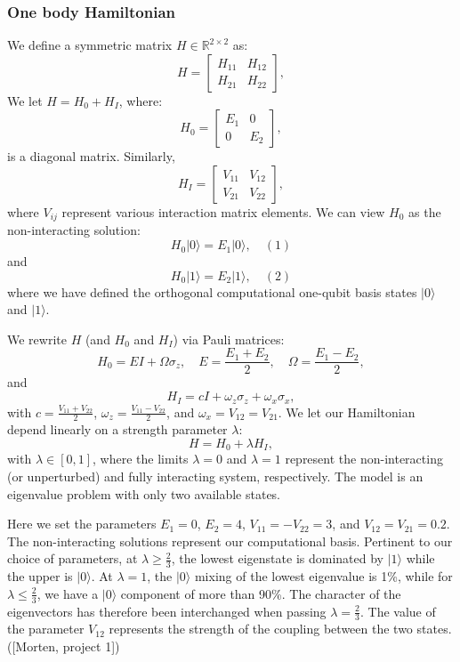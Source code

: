 \documentclass[onecolumn,10pt,cleanfoot]{asme2ej}
\begin{document}
\subsubsection{One body Hamiltonian}
We define a symmetric matrix $H \in \mathbb{R}^{2 \times 2}$ as:
\[
H =
\begin{bmatrix}
H_{11} & H_{12} \\
H_{21} & H_{22}
\end{bmatrix},
\]
We let $H = H_0 + H_I$, where:
\[
H_0 =
\begin{bmatrix}
E_1 & 0 \\
0 & E_2
\end{bmatrix},
\]
is a diagonal matrix. Similarly,
\[
H_I =
\begin{bmatrix}
V_{11} & V_{12} \\
V_{21} & V_{22}
\end{bmatrix},
\]
where $V_{ij}$ represent various interaction matrix elements. We can view $H_0$ as the non-interacting solution:
\[
H_0|0\rangle = E_1|0\rangle, \quad (1)
\]
and
\[
H_0|1\rangle = E_2|1\rangle, \quad (2)
\]
where we have defined the orthogonal computational one-qubit basis states $|0\rangle$ and $|1\rangle$.

We rewrite $H$ (and $H_0$ and $H_I$) via Pauli matrices:
\[
H_0 = E I + \Omega \sigma_z, \quad E = \frac{E_1 + E_2}{2}, \quad \Omega = \frac{E_1 - E_2}{2},
\]
and
\[
H_I = cI + \omega_z \sigma_z + \omega_x \sigma_x,
\]
with $c = \frac{V_{11} + V_{22}}{2}$, $\omega_z = \frac{V_{11} - V_{22}}{2}$, and $\omega_x = V_{12} = V_{21}$. We let our Hamiltonian depend linearly on a strength parameter $\lambda$:
\[
H = H_0 + \lambda H_I,
\]
with $\lambda \in [0, 1]$, where the limits $\lambda = 0$ and $\lambda = 1$ represent the non-interacting (or unperturbed) and fully interacting system, respectively. The model is an eigenvalue problem with only two available states.

Here we set the parameters $E_1 = 0$, $E_2 = 4$, $V_{11} = -V_{22} = 3$, and $V_{12} = V_{21} = 0.2$. The non-interacting solutions represent our computational basis. Pertinent to our choice of parameters, at $\lambda \geq \frac{2}{3}$, the lowest eigenstate is dominated by $|1\rangle$ while the upper is $|0\rangle$. At $\lambda = 1$, the $|0\rangle$ mixing of the lowest eigenvalue is 1\%, while for $\lambda \leq \frac{2}{3}$, we have a $|0\rangle$ component of more than 90\%. The character of the eigenvectors has therefore been interchanged when passing $\lambda = \frac{2}{3}$. The value of the parameter $V_{12}$ represents the strength of the coupling between the two states. ([Morten, project 1])
\end{document}
